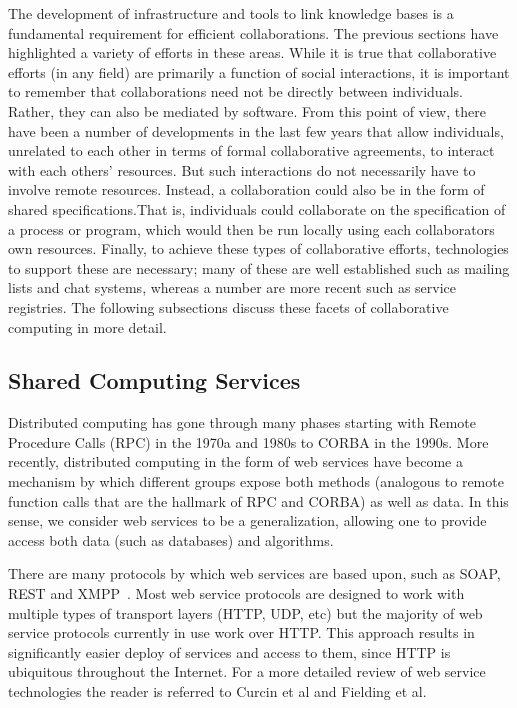 \documentclass[11pt]{book}
\begin{document}
The development of infrastructure and tools to link knowledge bases is
a fundamental requirement for efficient collaborations. The previous
sections have highlighted a variety of efforts in these areas. While
it is true that collaborative efforts (in any field) are primarily a
function of social interactions, it is important to remember that
collaborations need not be directly between individuals. Rather, they
can also be mediated by software. From this point of view, there have
been a number of developments in the last few years that allow
individuals, unrelated to each other in terms of formal collaborative
agreements, to interact with each others' resources. But such
interactions do not necessarily have to involve remote
resources. Instead, a collaboration could also be in the form of
shared specifications.That is, individuals could collaborate on the
specification of a process or program, which would then be run locally
using each collaborators own resources. Finally, to achieve these
types of collaborative efforts, technologies to support these are
necessary; many of these are well established such as mailing lists
and chat systems, whereas a number are more recent such as service
registries. The following subsections discuss these facets of
collaborative computing in more detail.

\subsection{Shared Computing Services}
\label{ref:ws}

Distributed computing has gone through many phases starting with
Remote Procedure Calls (RPC) in the 1970a and 1980s to CORBA in the
1990s. More recently, distributed computing in the form of web
services have become a mechanism by which different groups expose both
methods (analogous to remote function calls that are the hallmark of
RPC and CORBA) as well as data. In this sense, we consider web
services to be a generalization, allowing one to provide access both
data (such as databases) and algorithms.

There are many protocols by which web services are based upon, such as SOAP, REST and
XMPP~\cite{Wagener2009}. Most web service protocols are designed to
work with multiple types of transport layers (HTTP, UDP, etc) but the
majority of web service protocols currently in use work over
HTTP. This approach results in significantly easier deploy of services
and access to them, since HTTP is ubiquitous throughout the
Internet. For a more detailed review of web service technologies the
reader is referred to Curcin et al\cite{Curcin:2005fk} and Fielding et
al\cite{Fielding:2002eu}.
\end{document}
